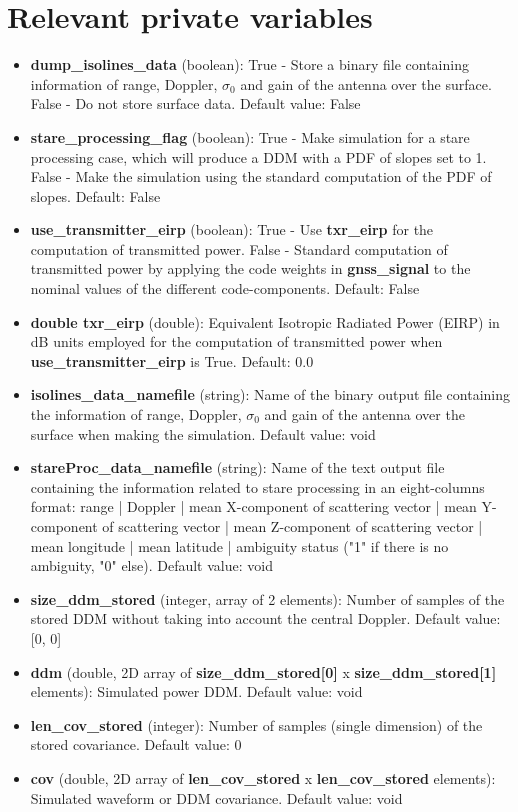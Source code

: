 \section{Relevant private variables}

\begin{itemize}
\item {\bf dump\_isolines\_data} (boolean): True - Store a binary file containing information of range, Doppler, $\sigma_0$ and gain of the antenna over the surface. False - Do not store surface data. Default value: False

\item {\bf stare\_processing\_flag} (boolean): True - Make simulation for a stare processing case, which will produce a DDM with a PDF of slopes set to 1. False - Make the simulation using the standard computation of the PDF of slopes. Default: False

\item {\bf use\_transmitter\_eirp} (boolean): True - Use {\bf txr\_eirp} for the computation of transmitted power. False - Standard computation of transmitted power by applying the code weights in {\bf gnss\_signal} to the nominal values of the different code-components. Default: False

\item {\bf double txr\_eirp} (double): Equivalent Isotropic Radiated Power (EIRP) in dB units employed for the computation of transmitted power when {\bf use\_transmitter\_eirp} is True. Default: 0.0

\item {\bf isolines\_data\_namefile} (string): Name of the binary output file containing the information of range, Doppler, $\sigma_0$ and gain of the antenna over the surface when making the simulation. Default value: void

\item {\bf stareProc\_data\_namefile} (string): Name of the text output file containing the information related to stare processing in an eight-columns format: range | Doppler | mean X-component of scattering vector | mean Y-component of scattering vector | mean Z-component of scattering vector | mean longitude | mean latitude | ambiguity status ("1" if there is no ambiguity, "0" else). Default value: void

\item {\bf size\_ddm\_stored} (integer, array of 2 elements): Number of samples of the stored DDM without taking into account the central Doppler. Default value: [0, 0]

\item {\bf ddm} (double, 2D array of {\bf size\_ddm\_stored[0]} x {\bf size\_ddm\_stored[1]} elements): Simulated power DDM. Default value: void

\item {\bf len\_cov\_stored} (integer): Number of samples (single dimension) of the stored covariance. Default value: 0

\item {\bf cov} (double, 2D array of {\bf len\_cov\_stored} x {\bf len\_cov\_stored} elements): Simulated waveform or DDM covariance. Default value: void

\end{itemize}

